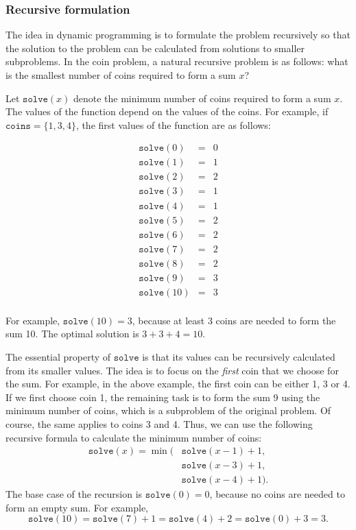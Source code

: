 \subsubsection{Recursive formulation}

The idea in dynamic programming is to
formulate the problem recursively so
that the solution to the problem can be
calculated from solutions to smaller
subproblems.
In the coin problem, a natural recursive
problem is as follows:
what is the smallest number of coins
required to form a sum $x$?

Let $\texttt{solve}(x)$
denote the minimum
number of coins required to form a sum $x$.
The values of the function depend on the
values of the coins.
For example, if $\texttt{coins} = \{1,3,4\}$,
the first values of the function are as follows:

\[
\begin{array}{lcl}
\texttt{solve}(0) & = & 0 \\
\texttt{solve}(1) & = & 1 \\
\texttt{solve}(2) & = & 2 \\
\texttt{solve}(3) & = & 1 \\
\texttt{solve}(4) & = & 1 \\
\texttt{solve}(5) & = & 2 \\
\texttt{solve}(6) & = & 2 \\
\texttt{solve}(7) & = & 2 \\
\texttt{solve}(8) & = & 2 \\
\texttt{solve}(9) & = & 3 \\
\texttt{solve}(10) & = & 3 \\
\end{array}
\]

For example, $\texttt{solve}(10)=3$,
because at least 3 coins are needed
to form the sum 10.
The optimal solution is $3+3+4=10$.

The essential property of $\texttt{solve}$ is
that its values can be
recursively calculated from its smaller values.
The idea is to focus on the \emph{first}
coin that we choose for the sum.
For example, in the above example,
the first coin can be either 1, 3 or 4.
If we first choose coin 1,
the remaining task is to form the sum 9
using the minimum number of coins,
which is a subproblem of the original problem.
Of course, the same applies to coins 3 and 4.
Thus, we can use the following recursive formula
to calculate the minimum number of coins:
\begin{equation*}
\begin{split}
\texttt{solve}(x) = \min( & \texttt{solve}(x-1)+1, \\
                           & \texttt{solve}(x-3)+1, \\
                           & \texttt{solve}(x-4)+1).
\end{split}
\end{equation*}
The base case of the recursion is $\texttt{solve}(0)=0$,
because no coins are needed to form an empty sum.
For example,
\[ \texttt{solve}(10) = \texttt{solve}(7)+1 = \texttt{solve}(4)+2 = \texttt{solve}(0)+3 = 3.\]


